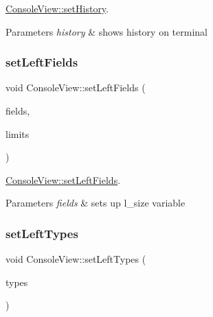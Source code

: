 \hyperlink{class_console_view_acd2e5ae5d77096c4227c2c9c5881926b}{Console\+View\+::set\+History}. 


\begin{DoxyParams}{Parameters}
{\em history} & shows history on terminal \\
\hline
\end{DoxyParams}
\mbox{\label{class_console_view_ae813b6a54bc56f1a22b60ee005da813e}} 
\subsubsection{\texorpdfstring{set\+Left\+Fields}{setLeftFields}}
{\footnotesize\ttfamily void Console\+View\+::set\+Left\+Fields (\begin{DoxyParamCaption}\item[{const int \&}]{fields,  }\item[{const Q\+Vector$<$ Q\+String $>$ \&}]{limits }\end{DoxyParamCaption})\hspace{0.3cm}{\ttfamily [slot]}}



\hyperlink{class_console_view_ae813b6a54bc56f1a22b60ee005da813e}{Console\+View\+::set\+Left\+Fields}. 


\begin{DoxyParams}{Parameters}
{\em fields} & sets up l\+\_\+size variable \\
\hline
\end{DoxyParams}
\mbox{\label{class_console_view_a7dcc84dc917fb81babae471315e9cefd}} 
\subsubsection{\texorpdfstring{set\+Left\+Types}{setLeftTypes}}
{\footnotesize\ttfamily void Console\+View\+::set\+Left\+Types (\begin{DoxyParamCaption}\item[{const Q\+Vector$<$ Q\+String $>$}]{types }\end{DoxyParamCaption})\hspace{0.3cm}{\ttfamily [slot]}}



